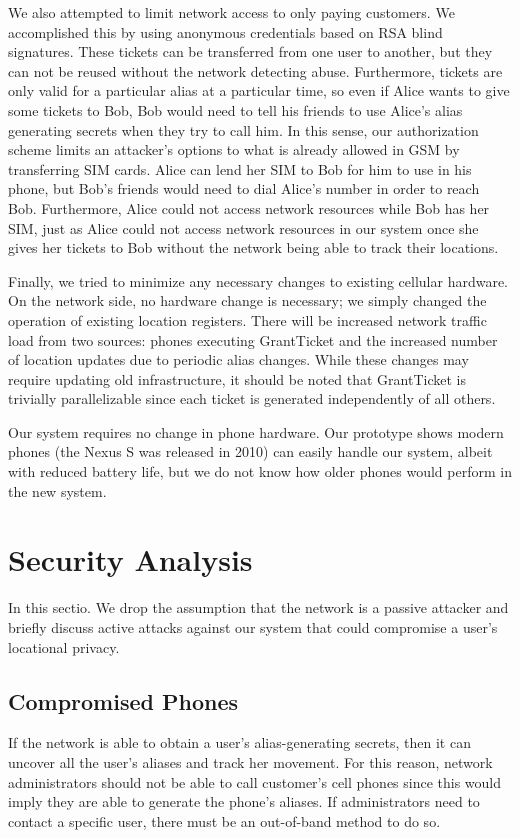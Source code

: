 \documentclass[11pt]{article}
\begin{document}
We also attempted to limit network access to only paying customers. We accomplished this by using anonymous credentials based on RSA blind signatures. These tickets can be transferred from one user to another, but they can not be reused without the network detecting abuse. Furthermore, tickets are only valid for a particular alias at a particular time, so even if Alice wants to give some tickets to Bob, Bob would need to tell his friends to use Alice's alias generating secrets when they try to call him. In this sense, our authorization scheme limits an attacker's options to what is already allowed in GSM by transferring SIM cards. Alice can lend her SIM to Bob for him to use in his phone, but Bob's friends would need to dial Alice's number in order to reach Bob. Furthermore, Alice could not access network resources while Bob has her SIM, just as Alice could not access network resources in our system once she gives her tickets to Bob without the network being able to track their locations.   

Finally, we tried to minimize any necessary changes to existing cellular hardware. On the network side, no hardware change is necessary; we simply changed the operation of existing location registers. There will be increased network traffic load from two sources: phones executing GrantTicket and the increased number of location updates due to periodic alias changes. While these changes may require updating old infrastructure, it should be noted that GrantTicket is trivially parallelizable since each ticket is generated independently of all others.

Our system requires no change in phone hardware. Our prototype shows modern phones (the Nexus S was released in 2010) can easily handle our system, albeit with reduced battery life, but we do not know how older phones would perform in the new system. 

\section{Security Analysis}
In this sectio. We drop the assumption that the network is a passive attacker and briefly discuss active attacks against our system that could compromise a user's locational privacy.

\subsection{Compromised Phones}
If the network is able to obtain a user's alias-generating secrets, then it can uncover all the user's aliases and track her movement. For this reason, network administrators should not be able to call customer's cell phones since this would imply they are able to generate the phone's aliases. If administrators need to contact a specific user, there must be an out-of-band method to do so.
\end{document}
